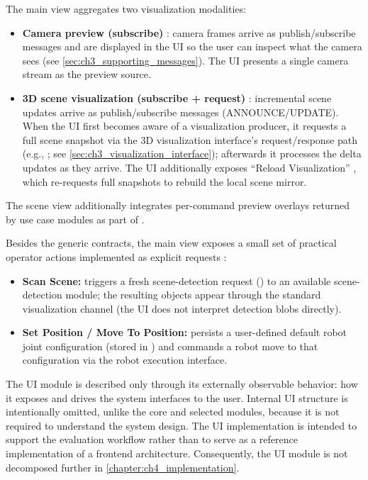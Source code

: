 The main view aggregates two visualization modalities:
\begin{itemize}
    \item \textbf{Camera preview (subscribe)} : camera frames arrive as publish/subscribe messages and are displayed in the UI so the user can inspect what the camera sees (see \autoref{sec:ch3_supporting_messages}). The UI presents a single camera stream as the preview source.
    \item \textbf{3D scene visualization (subscribe + request)} : incremental scene updates arrive as publish/subscribe messages (ANNOUNCE/UPDATE). When the UI first becomes aware of a visualization producer, it requests a full scene snapshot via the 3D visualization interface's request/response path (e.g., ; see \autoref{sec:ch3_visualization_interface}); afterwards it processes the delta updates as they arrive. The UI additionally exposes ``Reload Visualization'' , which re-requests full snapshots to rebuild the local scene mirror.
\end{itemize}
The scene view additionally integrates per-command preview overlays returned by use case modules as part of .

Besides the generic contracts, the main view exposes a small set of practical operator actions implemented as explicit requests :
\begin{itemize}
    \item \textbf{Scan Scene:} triggers a fresh scene-detection request () to an available scene-detection module; the resulting objects appear through the standard visualization channel (the UI does not interpret detection blobs directly).
    \item \textbf{Set Position / Move To Position:} persists a user-defined default robot joint configuration (stored in ) and commands a robot move to that configuration via the robot execution interface.
\end{itemize}

The UI module is described only through its externally observable behavior: how it exposes and drives the system interfaces to the user. Internal UI structure is intentionally omitted, unlike the core and selected modules, because it is not required to understand the system design. The UI implementation is intended to support the evaluation workflow rather than to serve as a reference implementation of a frontend architecture. Consequently, the UI module is not decomposed further in \autoref{chapter:ch4_implementation}.

